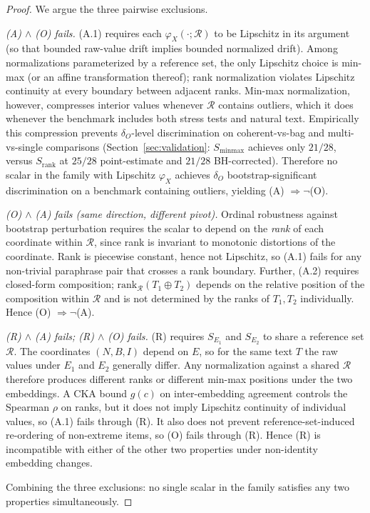 \documentclass[11pt]{article}
\begin{document}
\begin{proof}[Proof]
We argue the three pairwise exclusions.

\emph{(A) $\wedge$ (O) fails.} (A.1) requires each $\varphi_X(\cdot; \mathcal{R})$ to be Lipschitz in its argument (so that bounded raw-value drift implies bounded normalized drift). Among normalizations parameterized by a reference set, the only Lipschitz choice is min-max (or an affine transformation thereof); rank normalization violates Lipschitz continuity at every boundary between adjacent ranks. Min-max normalization, however, compresses interior values whenever $\mathcal{R}$ contains outliers, which it does whenever the benchmark includes both stress tests and natural text. Empirically this compression prevents $\delta_O$-level discrimination on coherent-vs-bag and multi-vs-single comparisons (Section~\ref{sec:validation}: $S_{\mathrm{minmax}}$ achieves only $21/28$, versus $S_{\mathrm{rank}}$ at $25/28$ point-estimate and $21/28$ BH-corrected). Therefore no scalar in the family with Lipschitz $\varphi_X$ achieves $\delta_O$ bootstrap-significant discrimination on a benchmark containing outliers, yielding (A) $\Rightarrow \neg$(O).

\emph{(O) $\wedge$ (A) fails (same direction, different pivot).} Ordinal robustness against bootstrap perturbation requires the scalar to depend on the \emph{rank} of each coordinate within $\mathcal{R}$, since rank is invariant to monotonic distortions of the coordinate. Rank is piecewise constant, hence not Lipschitz, so (A.1) fails for any non-trivial paraphrase pair that crosses a rank boundary. Further, (A.2) requires closed-form composition; $\mathrm{rank}_{\mathcal{R}}(T_1 \oplus T_2)$ depends on the relative position of the composition within $\mathcal{R}$ and is not determined by the ranks of $T_1, T_2$ individually. Hence (O) $\Rightarrow \neg$(A).

\emph{(R) $\wedge$ (A) fails; (R) $\wedge$ (O) fails.} (R) requires $S_{E_1}$ and $S_{E_2}$ to share a reference set $\mathcal{R}$. The coordinates $(N, B, I)$ depend on $E$, so for the same text $T$ the raw values under $E_1$ and $E_2$ generally differ. Any normalization against a shared $\mathcal{R}$ therefore produces different ranks or different min-max positions under the two embeddings. A CKA bound $g(c)$ on inter-embedding agreement controls the Spearman $\rho$ on ranks, but it does not imply Lipschitz continuity of individual values, so (A.1) fails through (R). It also does not prevent reference-set-induced re-ordering of non-extreme items, so (O) fails through (R). Hence (R) is incompatible with either of the other two properties under non-identity embedding changes.

Combining the three exclusions: no single scalar in the family satisfies any two properties simultaneously.
\end{proof}
\end{document}
